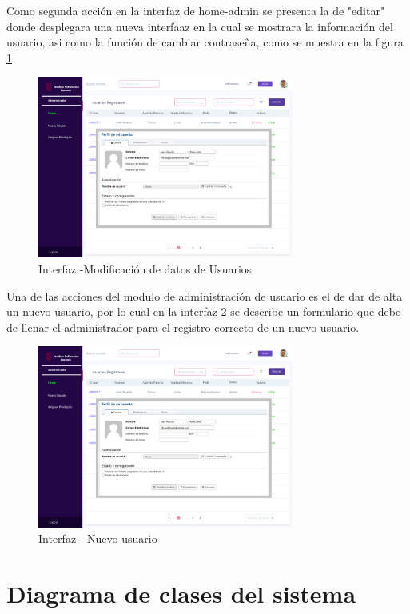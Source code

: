 Como segunda acción en la interfaz de home-admin se presenta la  de "editar" donde desplegara una nueva interfaaz en la cual se mostrara la información del usuario, asi como la función de cambiar contraseña, como se muestra en la figura \ref{fig:ModADM}

\begin{figure}[H]
	\centering
	\includegraphics[width=0.75\textwidth]{Capitulo4/Img/GestionUser/Modificar_Datos}
	\caption{Interfaz -Modificación de datos de Usuarios}
	\label{fig:ModADM}
\end{figure}


Una de las acciones  del modulo de administración de usuario es el de dar de alta un nuevo usuario, por lo cual en la interfaz \ref{fig:Nievoadm} se describe un formulario que debe de llenar el administrador para el registro correcto de un nuevo usuario. 
\begin{figure}[H]
	\centering
	\includegraphics[width=0.75\textwidth]{Capitulo4/Img/GestionUser/Modificar_Datos}
	\caption{Interfaz - Nuevo usuario}
	\label{fig:Nievoadm}
\end{figure}


\newpage
\section{Diagrama de clases del sistema}

